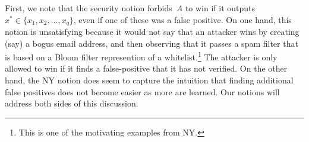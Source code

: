 First, we note that the security notion forbids~$A$ to win if it outputs $x^* \in \{x_1,x_2,\ldots,x_q\}$, even if one of these was a false positive.  On one hand, this notion is unsatisfying because it would not say that an attacker wins by creating (say) a bogus email address, and then observing that it passes a spam filter that is based on a Bloom filter represention of a whitelist.\footnote{This is one of the motivating examples from NY.}  The attacker is only allowed to win if it finds a false-positive that it has not verified.  On the other hand, the NY notion does seem to capture the intuition that finding additional false positives does not become easier as more are learned.  Our notions will address both sides of this discussion.
%
%
%

